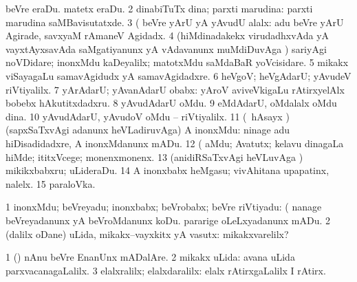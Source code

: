 \noindent
\gl{\pagu}
\bmng
\bnum
{}  
\banum
{} beVre eraDu. 
 matetx eraDu. 
\eanum
\numie
\num{2}  dinabiTuTx dina; parxti marudina:  parxti marudina saMBavisutatxde. 
\num{3}  (  beVre yArU yA yAvudU alalx:  adu beVre yArU Agirade, savxyaM rAmaneV Agidadx. 
\num{4}  (hiMdinadakekx virudadhxvAda yA vayxtAyxsavAda saMgatiyanunx yA vAdavanunx muMdiDuvAga \parx) sariyAgi noVDidare; inonxMdu kaDeyalilx; matotxMdu saMdaBaR yoVcisidare. 
\num{5}  mikakx viSayagaLu samavAgidudx yA samavAgidadxre. 
\num{6}  heVgoV; heVgAdarU; yAvudeV riVtiyalilx. 
\num{7}  yArAdarU; yAvanAdarU obabx:  yAroV aviveVkigaLu rAtirxyelAlx bobebx hAkutitxdadxru. 
\num{8}  yAvudAdarU oMdu. 
\num{9}  eMdAdarU, oMdalalx oMdu dina. 
\num{10}  yAvudAdarU, yAvudoV oMdu -- riVtiyalilx. 
\num{11}  (\kanmu\ hAsayx \parx) (sapxSaTxvAgi adanunx heVLadiruvAga) A inonxMdu:  ninage adu hiDisadidadxre, A inonxMdanunx mADu. 
\num{12} (  aMdu; Avatutx; kelavu dinagaLa hiMde; ititxVcege; monenxmonenx. 
\num{13}  (anidiRSaTxvAgi heVLuvAga \parx) mikikxbabxru; uLideraDu. 
\num{14}  A inonxbabx heMgasu; vivAhitana upapatinx, nalelx. 
\num{15}  paraloVka. 
\enum
\emng
\eentry

\bentry
{}
\bmng
\bnum
\num{1} inonxMdu; beVreyadu; inonxbabx; beVrobabx; beVre riVtiyadu:  (  nanage beVreyadanunx yA beVroMdanunx koDu.  pararige oLeLxyadanunx mADu. 
\num{2} (\bava dalilx  oDane) uLida, mikakx--vayxkitx yA vasutx:  mikakxvarelilx? 
\enum
\emng

\noindent
\gl{\pagu}
\bmng
\bnum
\num{1}  (\pArxparx) nAnu beVre EnanUnx mADalAre. 
\num{2}  mikakx uLida:  avana uLida parxvacanagaLalilx. 
\num{3}  elalxralilx; elalxdaralilx:  elalx rAtirxgaLalilx I rAtirx. 
\enum
\emng
\eentry

